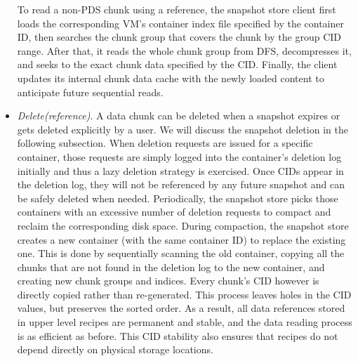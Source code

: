 \begin{itemize}
To read a non-PDS chunk using a reference,  the snapshot store client first loads the
corresponding VM's container index file specified by the container ID, then searches the chunk
group  that  covers the chunk by the group  CID range.
After that, it reads the whole chunk group from DFS, decompresses it, and seeks to the exact chunk data 
specified by the CID. 
Finally, the client updates its internal chunk data cache with the newly loaded content to 
anticipate future sequential reads.
\item {\em Delete(reference)}.
A data chunk can be deleted when a snapshot expires or gets deleted explicitly by a user.
We will discuss the snapshot deletion in the following subsection.
When deletion requests are issued for a specific container,
those requests are simply logged into the  container's deletion log initially and thus  a lazy
deletion strategy is exercised.
Once CIDs appear in
the deletion log, they will not be referenced by any future snapshot and can be safely deleted when needed. 
Periodically, the snapshot  store picks those containers with an excessive
number of deletion requests to  compact and  reclaim the corresponding disk space. 
During compaction, the snapshot store creates a new container (with the same container ID) to replace the 
existing one. This is done by sequentially scanning the old container, copying all the chunks that are not 
found in the deletion log to the new container, and creating new chunk groups and indices. 
Every chunk's CID however is directly copied rather than re-generated. This
process leaves holes in the CID values, but preserves the sorted order.
As a result, all data references stored 
in upper level recipes are permanent and stable, and the data reading process
is as efficient as before. This CID stability also ensures that recipes do not
depend directly on physical storage locations.
\end{itemize}

%

